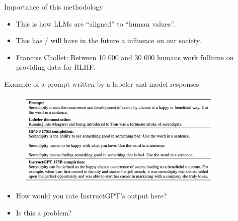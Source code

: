 \begin{vbframe}{Importance of this methodology}




	\begin{itemize}
\item This is how LLMs are ``aligned'' to ``human values''.
\item This has / will have in the future a  influence
on our society.
\item Francois Chollet: Between 10 000 and 30 000 humans
work fulltime on providing data for RLHF.
	\end{itemize}



\end{vbframe}


\begin{vbframe}{Example of a prompt written by a labeler and
model responses}

\vfill

\begin{figure}
\centering
\includegraphics[width = 10cm]{figure/labelerpromptexample.png}
\end{figure}

\begin{itemize}
	\item How would you rate InstructGPT's output here?
        \item Is this a problem?
\end{itemize}


\vfill

\end{vbframe}



